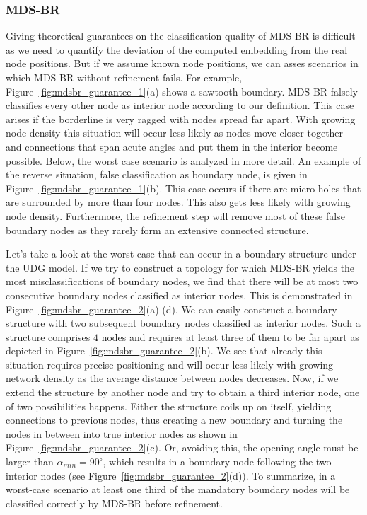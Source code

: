 \documentclass{llncs}
\begin{document}
\subsubsection{MDS-BR}
Giving theoretical guarantees on the classification quality of MDS-BR is difficult as we need to quantify the deviation of the computed embedding from the real node positions.
But if we assume known node positions, we can asses scenarios in which MDS-BR without refinement fails.
For example, Figure~\ref{fig:mdsbr_guarantee_1}(a) shows a sawtooth boundary.
MDS-BR falsely classifies every other node as interior node according to our definition.
This case arises if the borderline is very ragged with nodes spread far apart.
With growing node density this situation will occur less likely as nodes move closer together and connections that span acute angles and put them in the interior  become possible.
Below, the worst case scenario is analyzed in more detail.
An example of the reverse situation, false classification as boundary node, is given in Figure~\ref{fig:mdsbr_guarantee_1}(b).
This case occurs if there are micro-holes that are surrounded by more than four nodes.
This also gets less likely with growing node density.
Furthermore, the refinement step will remove most of these false boundary nodes as they rarely form an extensive connected structure.

Let's take a look at the worst case that can occur in a boundary structure under the UDG model.
If we try to construct a topology for which MDS-BR yields the most misclassifications of boundary nodes, we find that there will be at most two consecutive boundary nodes classified as interior nodes.
This is demonstrated in Figure~\ref{fig:mdsbr_guarantee_2}(a)-(d).
We can easily construct a boundary structure with two subsequent boundary nodes classified as interior nodes.
Such a structure comprises $4$ nodes and requires at least three of them to be far apart as depicted in Figure~\ref{fig:mdsbr_guarantee_2}(b).
We see that already this situation requires precise positioning and will occur less likely with growing network density as the average distance between nodes decreases.
Now, if we extend the structure by another node and try to obtain a third interior node, one of two possibilities happens.
Either the structure coils up on itself, yielding connections to previous nodes, thus creating a new boundary and turning the nodes in between into true interior nodes as shown in Figure~\ref{fig:mdsbr_guarantee_2}(c).
Or, avoiding this, the opening angle must be larger than $\alpha_{min}=90^\circ$, which results in a boundary node following the two interior nodes (see Figure~\ref{fig:mdsbr_guarantee_2}(d)).
To summarize, in a worst-case scenario at least one third of the mandatory boundary nodes will be classified correctly by MDS-BR before refinement.
\end{document}

